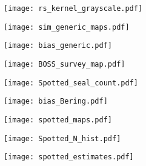 \documentclass[12pt,english]{article}
\begin{document}
\begin{spacing}{1.9}
\begin{figure*}
\begin{center}
\texttt{[image: rs\_kernel\_grayscale.pdf]}
\caption{} \label{fig:res-sel}
\end{center}
\end{figure*}

\begin{figure*}
\begin{center}
\texttt{[image: sim\_generic\_maps.pdf]}
\caption{}
\label{fig:sim_maps}
\end{center}
\end{figure*}

\begin{figure*}
\begin{center}
\texttt{[image: bias\_generic.pdf]}
\caption{
}
\label{fig:bias_generic}
\end{center}
\end{figure*}

\begin{figure*}
\begin{center}
\texttt{[image: BOSS\_survey\_map.pdf]}
\caption{
}
\label{fig:BOSS_effort}
\end{center}
\end{figure*}

\begin{figure*}
\begin{center}
\texttt{[image: Spotted\_seal\_count.pdf]}
\caption{
}
\label{fig:spotted_counts}
\end{center}
\end{figure*}

\begin{figure*}
\begin{center}
\texttt{[image: bias\_Bering.pdf]}
\caption{
}
\label{fig:bias_spotted}
\end{center}
\end{figure*}

\begin{figure*}
\begin{center}
\texttt{[image: spotted\_maps.pdf]}
\caption{}
\label{fig:spotted_maps}
\end{center}
\end{figure*}

\begin{figure*}
\begin{center}
\texttt{[image: Spotted\_N\_hist.pdf]}
\caption{}
\label{fig:spotted_N}
\end{center}
\end{figure*}

\begin{figure*}
\begin{center}
\texttt{[image: spotted\_estimates.pdf]}
\caption{}
\label{fig:spotted_covs}
\end{center}
\end{figure*}

\end{spacing}
\end{document}
